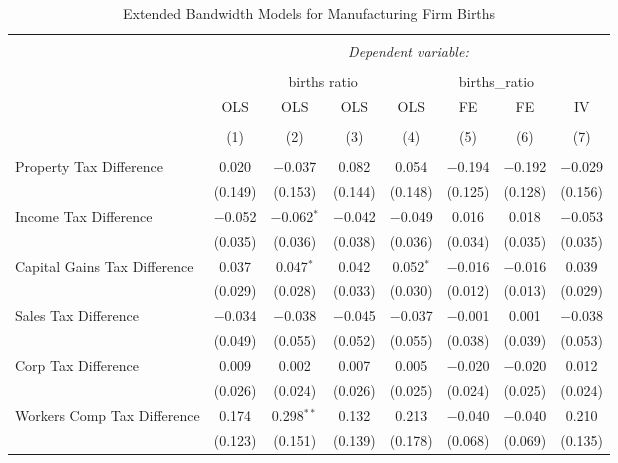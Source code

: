 
\begin{table}[!htbp] \centering 
  \caption{Extended Bandwidth Models for  Manufacturing Firm Births} 
  \label{} 
\begin{tabular}{@{\extracolsep{5pt}}lccccccc} 
\\[-1.8ex]\hline 
\hline \\[-1.8ex] 
 & \multicolumn{7}{c}{\textit{Dependent variable:}} \\ 
\cline{2-8} 
\\[-1.8ex] & \multicolumn{4}{c}{births ratio} & \multicolumn{2}{c}{births\_ratio} &   \\ 
 & OLS & OLS & OLS & OLS & FE & FE & IV \\ 
\\[-1.8ex] & (1) & (2) & (3) & (4) & (5) & (6) & (7)\\ 
\hline \\[-1.8ex] 
 Property Tax Difference & 0.020 & $-$0.037 & 0.082 & 0.054 & $-$0.194 & $-$0.192 & $-$0.029 \\ 
  & (0.149) & (0.153) & (0.144) & (0.148) & (0.125) & (0.128) & (0.156) \\ 
  Income Tax Difference & $-$0.052 & $-$0.062$^{*}$ & $-$0.042 & $-$0.049 & 0.016 & 0.018 & $-$0.053 \\ 
  & (0.035) & (0.036) & (0.038) & (0.036) & (0.034) & (0.035) & (0.035) \\ 
  Capital Gains Tax Difference & 0.037 & 0.047$^{*}$ & 0.042 & 0.052$^{*}$ & $-$0.016 & $-$0.016 & 0.039 \\ 
  & (0.029) & (0.028) & (0.033) & (0.030) & (0.012) & (0.013) & (0.029) \\ 
  Sales Tax Difference & $-$0.034 & $-$0.038 & $-$0.045 & $-$0.037 & $-$0.001 & 0.001 & $-$0.038 \\ 
  & (0.049) & (0.055) & (0.052) & (0.055) & (0.038) & (0.039) & (0.053) \\ 
  Corp Tax Difference & 0.009 & 0.002 & 0.007 & 0.005 & $-$0.020 & $-$0.020 & 0.012 \\ 
  & (0.026) & (0.024) & (0.026) & (0.025) & (0.024) & (0.025) & (0.024) \\ 
  Workers Comp Tax Difference & 0.174 & 0.298$^{**}$ & 0.132 & 0.213 & $-$0.040 & $-$0.040 & 0.210 \\ 
  & (0.123) & (0.151) & (0.139) & (0.178) & (0.068) & (0.069) & (0.135) \\ 

\end{tabular}
\end{table}
